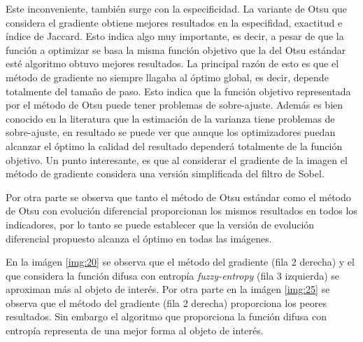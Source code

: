 \documentclass[preprint,12pt]{elsarticle}
\begin{document}
%
Este inconveniente, también surge con la especificidad.
%
La variante de Otsu que considera el gradiente obtiene mejores resultados en la especifidad, exactitud e índice de Jaccard.
%
Esto indica algo muy importante, es decir, a pesar de que la función a optimizar se basa la misma función objetivo que la del Otsu estándar esté algoritmo obtuvo mejores resultados.
%
La principal razón de esto es que el método de gradiente no siempre llagaba al óptimo global, es decir, depende totalmente del tamaño de paso.
%
Esto indica que la función objetivo representada por el método de Otsu puede tener problemas de sobre-ajuste.
%
Además es bien conocido en la literatura que la estimación de la varianza tiene problemas de sobre-ajuste, en resultado se puede ver que aunque los optimizadores puedan alcanzar el óptimo la calidad del resultado dependerá totalmente de la función objetivo.
%
Un punto interesante, es que al considerar el gradiente de la imagen el método de gradiente considera una versión simplificada del filtro de Sobel.

Por otra parte se observa que tanto el método de Otsu estándar como el método de Otsu con evolución diferencial proporcionan los mismos resultados en todos los indicadores, por lo tanto se puede establecer que la versión de evolución diferencial propuesto alcanza el óptimo en todas las imágenes.


En la imágen \ref{img:20} se observa que el método del gradiente (fila 2 derecha) y el que considera la función difusa con entropía \textit{fuzzy-entropy} (fila 3 izquierda) se aproximan más al objeto de interés.
%
Por otra parte en la imágen \ref{img:25} se observa que el método del gradiente (fila 2 derecha) proporciona los peores resultados.
%
Sin embargo el algoritmo que proporciona la función difusa con entropía representa de una mejor forma al objeto de interés.
\end{document}
